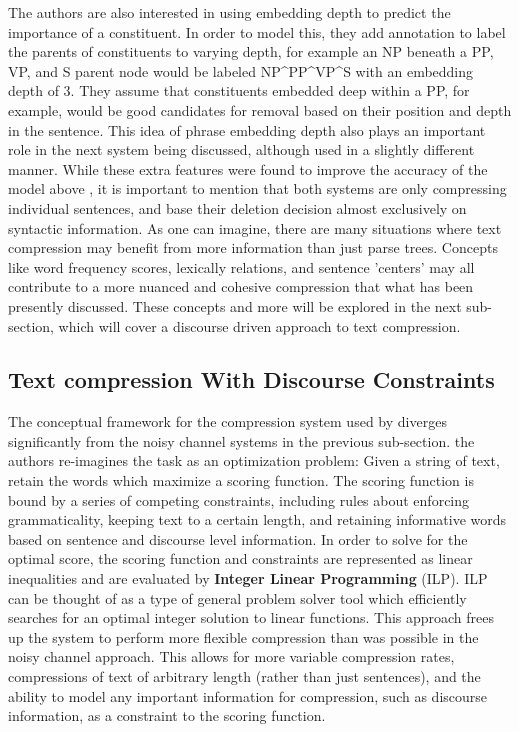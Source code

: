 {The authors are also interested in using embedding depth to predict the importance of a constituent.  In order to model this, they add annotation to label the parents of constituents to varying depth, for example an NP beneath a PP, VP, and S parent node would be labeled NP\^{}PP\^{}VP\^{}S with an embedding depth of 3.  They assume that constituents embedded deep within a PP, for example, would be good candidates for removal based on their position and depth in the sentence.  This idea of phrase embedding depth also plays an important role in the next system being discussed, although used in a slightly different manner.  While these extra features were found to improve the  accuracy of the \citet{galley2007lexicalized} model above \citet{knight2000statistics}, it is important to mention that both systems are only compressing individual sentences, and base their deletion decision almost exclusively on syntactic information. As one can imagine, there are many situations where text compression may benefit from more information than just parse trees. Concepts like word frequency scores, lexically relations, and sentence 'centers' may all contribute to a more nuanced and cohesive compression that what has been presently discussed.  These concepts and more will be explored in the next sub-section, which will cover a discourse driven approach to text compression.}




\subsection{Text compression With Discourse Constraints}
  

{The conceptual framework for the compression system used by \citet{Clarke:2010:DCD:1950488.1950493} diverges significantly from the noisy channel systems in the previous sub-section.  the authors re-imagines the task as an optimization problem:  Given a string of text, retain the words which maximize a scoring function.  The scoring function is bound by a series of competing constraints, including rules about enforcing grammaticality, keeping text to a certain length, and retaining informative words based on sentence and discourse level information\citep{Clarke:2010:DCD:1950488.1950493}.  In order to solve for the optimal score, the scoring function and constraints are represented as linear inequalities and are evaluated by \textbf{Integer Linear Programming} (ILP).  ILP can be thought of as a type of general problem solver tool which efficiently searches for an optimal integer solution to linear functions.  This approach frees up the system to perform more flexible compression than was possible in the noisy channel approach. This allows for more variable compression rates, compressions of text of arbitrary length (rather than just sentences), and the ability to model any important information for compression, such as discourse information, as a constraint to the scoring function.} 


